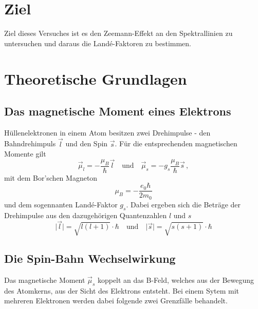 \section{Ziel}
    Ziel dieses Versuches ist es den Zeemann-Effekt an den Spektrallinien zu untersuchen und
    daraus die Landé-Faktoren zu bestimmen.
\section{Theoretische Grundlagen}
    \subsection{Das magnetische Moment eines Elektrons}
        Hüllenelektronen in einem Atom besitzen zwei Drehimpulse - den Bahndrehimpuls $\vec{l}$ und den Spin $\vec{s}$.
        Für die entsprechenden magnetischen Momente gilt
        \begin{equation}
            \vec{\mu}_l = -\frac{\mu_B}{\hbar}\vec{l} \quad\text{und}\quad \vec{\mu}_s = -g_s\frac{\mu_B}{\hbar}\vec{s} \, ,
        \end{equation}
        mit dem Bor'schen Magneton
        \begin{equation}
            \mu_B=-\frac{e_0\hbar}{2m_0}
        \end{equation}
        und dem sogennanten Landé-Faktor $g_s$.
        Dabei ergeben sich die Beträge der Drehimpulse aus den dazugehörigen Quantenzahlen $l$ und $s$
        \begin{equation}
            \vert\vec{l}\vert=\sqrt{l(l+1)}\cdot\hbar \quad\text{und}\quad \vert\vec{s}\vert=\sqrt{s(s+1)}\cdot\hbar
        \end{equation}
    \subsection{Die Spin-Bahn Wechselwirkung}
        Das magnetische Moment $\vec{\mu}_s$ koppelt an das B-Feld, welches aus der Bewegung des Atomkerns,
        aus der Sicht des Elektrons entsteht.
        Bei einem Sytem mit mehreren Elektronen werden dabei folgende zwei Grenzfälle behandelt.
